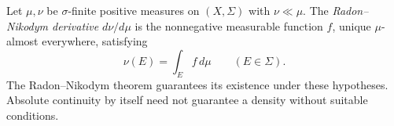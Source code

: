 
Let $\mu,\nu$ be $\sigma$-finite positive measures on $(X,\Sigma)$ with $\nu\ll\mu$. The \emph{Radon--Nikodym derivative} $d\nu/d\mu$ is the nonnegative measurable function $f$, unique $\mu$-almost everywhere, satisfying
\[
\nu(E)=\int_E f\,d\mu\qquad(E\in\Sigma).
\]
The Radon--Nikodym theorem guarantees its existence under these hypotheses. Absolute continuity by itself need not guarantee a density without suitable conditions.
